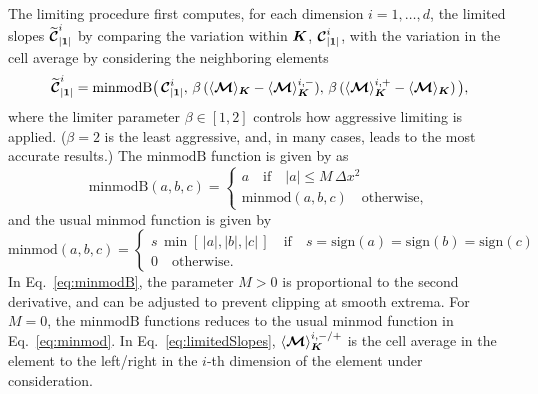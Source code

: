 \documentclass[10pt,preprint]{aastex}
\begin{document}
The limiting procedure first computes, for each dimension $i=1,\ldots,d$, the limited slopes $\widetilde{\boldsymbol{\mathcal{C}}}_{|\boldsymbol{1}|}^{i}$ by comparing the variation within $\boldsymbol{K}$, $\boldsymbol{\mathcal{C}}_{|\boldsymbol{1}|}^{i}$, with the variation in the cell average by considering the neighboring elements
\begin{equation}
  \widetilde{\boldsymbol{\mathcal{C}}}_{|\boldsymbol{1}|}^{i}
  =\text{minmodB}
  \big(\,
    \boldsymbol{\mathcal{C}}_{|\boldsymbol{1}|}^{i},\,
    \beta\,(\langle\boldsymbol{\mathcal{M}}\rangle_{\boldsymbol{K}}-\langle\boldsymbol{\mathcal{M}}\rangle_{\boldsymbol{K}}^{i,-}),\,
    \beta\,(\langle\boldsymbol{\mathcal{M}}\rangle_{\boldsymbol{K}}^{i,+}-\langle\boldsymbol{\mathcal{M}}\rangle_{\boldsymbol{K}})
  \,\big),
  \label{eq:limitedSlopes}
\end{equation}
where the limiter parameter $\beta\in[1,2]$ controls how aggressive limiting is applied.  
($\beta=2$ is the least aggressive, and, in many cases, leads to the most accurate results.)  
The $\text{minmodB}$ function is given by \citet{cockburnShu_2001} as
\begin{equation}
  \mbox{minmodB}(a,b,c)
  =\left\{\begin{array}{ll}
  a \quad\text{if}\quad |a|\le M\,\Delta x^{2} \\
  \mbox{minmod}(a,b,c) \quad \text{otherwise},
  \end{array}\right.
  \label{eq:minmodB}
\end{equation}
and the usual minmod function is given by
\begin{equation}
  \mbox{minmod}(a,b,c)
  =\left\{\begin{array}{ll}
  s\,\min[\,|a|,|b|,|c|\,] \quad\text{if}\quad s=\mbox{sign}(a)=\mbox{sign}(b)=\mbox{sign}(c) \\
  0 \quad \text{otherwise}.
  \end{array}\right.
  \label{eq:minmod}
\end{equation}
In Eq.~\eqref{eq:minmodB}, the parameter $M>0$ is proportional to the second derivative, and can be adjusted to prevent clipping at smooth extrema.  
For $M=0$, the $\text{minmodB}$ functions reduces to the usual minmod function in Eq.~\eqref{eq:minmod}.  
In Eq.~\eqref{eq:limitedSlopes}, $\langle\boldsymbol{\mathcal{M}}\rangle_{\boldsymbol{K}}^{i,-/+}$ is the cell average in the element to the left/right in the $i$-th dimension of the element under consideration.  
\end{document}

